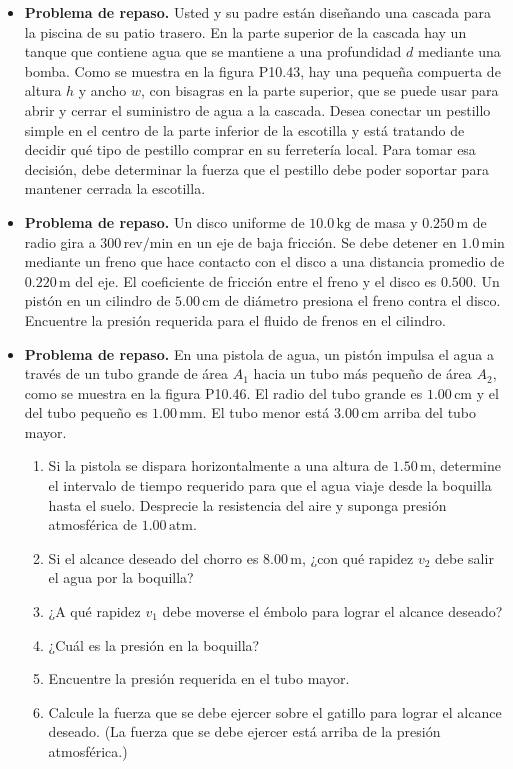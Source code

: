 \documentclass[11pt,a4paper]{article}
\begin{document}
\begin{itemize}
    \item[\textbf{44.}] \textbf{Problema de repaso.} Usted y su padre están diseñando una cascada para la piscina de su patio trasero. En la parte superior de la cascada hay un tanque que contiene agua que se mantiene a una profundidad \(d\) mediante una bomba. Como se muestra en la figura P10.43, hay una pequeña compuerta de altura \(h\) y ancho \(w\), con bisagras en la parte superior, que se puede usar para abrir y cerrar el suministro de agua a la cascada. Desea conectar un pestillo simple en el centro de la parte inferior de la escotilla y está tratando de decidir qué tipo de pestillo comprar en su ferretería local. Para tomar esa decisión, debe determinar la fuerza que el pestillo debe poder soportar para mantener cerrada la escotilla.
    
    \vspace*{7cm}
    
    \item[\textbf{45.}] \textbf{Problema de repaso.} Un disco uniforme de \(10.0\,\text{kg}\) de masa y \(0.250\,\text{m}\) de radio gira a \(300\,\text{rev/min}\) en un eje de baja fricción. Se debe detener en \(1.0\,\text{min}\) mediante un freno que hace contacto con el disco a una distancia promedio de \(0.220\,\text{m}\) del eje. El coeficiente de fricción entre el freno y el disco es \(0.500\). Un pistón en un cilindro de \(5.00\,\text{cm}\) de diámetro presiona el freno contra el disco. Encuentre la presión requerida para el fluido de frenos en el cilindro.
    \vspace*{7cm}
    
    \item[\textbf{46.}] \textbf{Problema de repaso.} En una pistola de agua, un pistón impulsa el agua a través de un tubo grande de área \(A_1\) hacia un tubo más pequeño de área \(A_2\), como se muestra en la figura P10.46. El radio del tubo grande es \(1.00\,\text{cm}\) y el del tubo pequeño es \(1.00\,\text{mm}\). El tubo menor está \(3.00\,\text{cm}\) arriba del tubo mayor.
    \begin{enumerate}
        \item Si la pistola se dispara horizontalmente a una altura de \(1.50\,\text{m}\), determine el intervalo de tiempo requerido para que el agua viaje desde la boquilla hasta el suelo. Desprecie la resistencia del aire y suponga presión atmosférica de \(1.00\,\text{atm}\).
        \item Si el alcance deseado del chorro es \(8.00\,\text{m}\), ¿con qué rapidez \(v_2\) debe salir el agua por la boquilla?
        \item ¿A qué rapidez \(v_1\) debe moverse el émbolo para lograr el alcance deseado?
        \item ¿Cuál es la presión en la boquilla?
        \item Encuentre la presión requerida en el tubo mayor.
        \item Calcule la fuerza que se debe ejercer sobre el gatillo para lograr el alcance deseado. (La fuerza que se debe ejercer está arriba de la presión atmosférica.)
    \end{enumerate}
    

\end{itemize}
\end{document}
